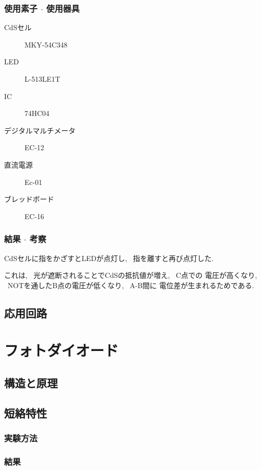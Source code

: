 \documentclass[titlepage]{jsarticle}
\begin{document}
        \subsubsection{使用素子 $\cdot$ 使用器具}
            \begin{description}
                \item[CdSセル] MKY-54C348
                \item[LED] L-513LE1T
                \item[IC] 74HC04
                \item[デジタルマルチメータ] EC-12
                \item[直流電源] Ec-01
                \item[ブレッドボード] EC-16 
            \end{description}

        \subsubsection{結果 $\cdot$ 考察}
            CdSセルに指をかざすとLEDが点灯し, ~指を離すと再び点灯した.

            これは, ~光が遮断されることでCdSの抵抗値が増え, ~C点での
            電圧が高くなり, ~NOTを通したB点の電圧が低くなり, ~A-B間に
            電位差が生まれるためである.

    \subsection{応用回路}

\section{フォトダイオード}
    \subsection{構造と原理}

    \subsection{短絡特性}
        \subsubsection{実験方法}

        \subsubsection{結果}
\end{document}

